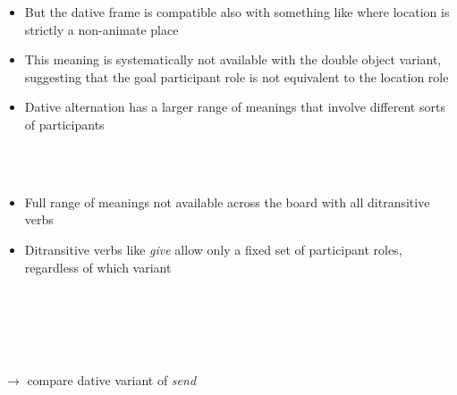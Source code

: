 \documentclass[headrule,footrule]{foils}
\begin{document}
\begin{itemize}
\item But the dative frame is compatible also with something like  where location is strictly a non-animate place
\item This meaning is systematically not available with the double object variant, suggesting that the goal participant role is not equivalent to the location role
\item Dative alternation has a larger range of meanings that involve different sorts of participants
\begin{exe}
  \ex \begin{xlist}
    \ex {}
    \\
    \ex {} \\
  \end{xlist}
\end{exe}
\end{itemize}

\begin{itemize}
\item Full range of meanings not available across the board with all ditransitive verbs
\item Ditransitive verbs like \emph{give} allow only a fixed set of participant roles, regardless of which variant
\end{itemize}
\begin{exe}
  \ex \begin{xlist}
    \ex {}
    \\
    \ex {} \\
  \end{xlist}
\end{exe}

\begin{exe}
  \ex \begin{xlist}
    \ex {}
    \\
    \ex {} \\ $\rightarrow$ compare dative variant of \emph{send}
  \end{xlist}
\end{exe}
\end{document}
